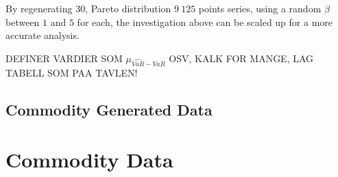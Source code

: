 By regenerating $30$, Pareto distribution $9 \ 125$ points series, using a random $\beta$ between $1$ and $5$ for each, the investigation above can be scaled up for a more accurate analysis. 

DEFINER VARDIER SOM $\mu_{\hat{VaR}-VaR}$ OSV, KALK FOR MANGE, LAG TABELL SOM PAA TAVLEN!

 

\subsection{Commodity Generated Data}

\section{Commodity Data}